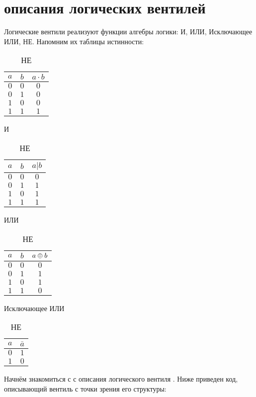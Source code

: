 \section{ описания логических вентилей}

\par{Логические вентили реализуют функции алгебры логики: И, ИЛИ, Исключающее ИЛИ, НЕ. Напомним их таблицы истинности:}

\begin{table}[!htbp]
  \parbox{.45\linewidth}{
    \centering
  \begin{tabular}{c|c|c}
    $a$&$b$&$a \cdot b$\\
    \hline
    $0$ & $0$ & $0$ \\
    $0$ & $1$ & $0$ \\
    $1$ & $0$ & $0$ \\
    $1$ & $1$ & $1$ \\
  \end{tabular}
  \caption{И}
} \hfill
  \parbox{.45\linewidth}{
    \centering
  \begin{tabular}{c|c|c}

    $a$&$b$&$a | b$\\
    \hline
    $0$ & $0$ & $0$ \\
    $0$ & $1$ & $1$ \\
    $1$ & $0$ & $1$ \\
    $1$ & $1$ & $1$ \\

  \end{tabular}
  \caption{ИЛИ}
}\hfill
  \parbox{.45\linewidth}{
    \centering
  \begin{tabular}{c|c|c}
    $a$&$b$&$a \mathbin{\oplus} b$\\
    \hline
    $0$ & $0$ & $0$ \\
    $0$ & $1$ & $1$ \\
    $1$ & $0$ & $1$ \\
    $1$ & $1$ & $0$ \\
  \end{tabular}
  \caption{Исключающее ИЛИ}
}\hfill
  \parbox{.45\linewidth}{
    \centering
  \begin{tabular}{c|c}
    $a$&$\bar{a}$\\
    \hline
    $0$ & $1$\\
    $1$ & $0$\\
  \end{tabular}
  \caption{НЕ}
}
\end{table}

\par{Начнём знакомиться с  с описания логического вентиля . Ниже приведен код, описывающий вентиль с точки зрения его структуры:}

